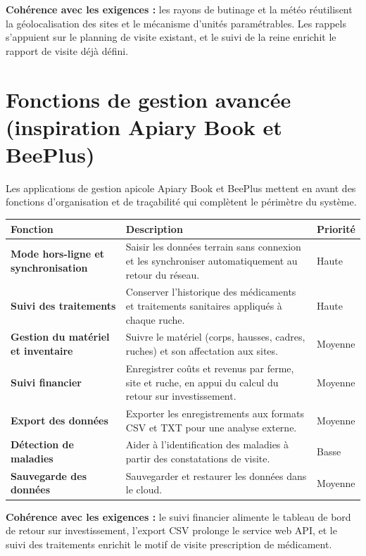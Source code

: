 \begin{encadre}
\textbf{Cohérence avec les exigences :} les rayons de butinage et la météo
réutilisent la géolocalisation des sites et le mécanisme d'unités paramétrables.
Les rappels s'appuient sur le planning de visite existant, et le suivi de la
reine enrichit le rapport de visite déjà défini.
\end{encadre}

\section{Fonctions de gestion avancée (inspiration Apiary Book et BeePlus)}
Les applications de gestion apicole Apiary Book et BeePlus mettent en avant des
fonctions d'organisation et de traçabilité qui complètent le périmètre du
système.
\begin{xltabular}{\textwidth}{>{\bfseries}p{4.2cm} X C{2.1cm}}
\toprule
\textbf{Fonction} & \textbf{Description} & \textbf{Priorité} \\
\midrule
\endhead
Mode hors-ligne et synchronisation & Saisir les données terrain sans connexion et les synchroniser automatiquement au retour du réseau. & Haute \\
Suivi des traitements & Conserver l'historique des médicaments et traitements sanitaires appliqués à chaque ruche. & Haute \\
Gestion du matériel et inventaire & Suivre le matériel (corps, hausses, cadres, ruches) et son affectation aux sites. & Moyenne \\
Suivi financier & Enregistrer coûts et revenus par ferme, site et ruche, en appui du calcul du retour sur investissement. & Moyenne \\
Export des données & Exporter les enregistrements aux formats CSV et TXT pour une analyse externe. & Moyenne \\
Détection de maladies & Aider à l'identification des maladies à partir des constatations de visite. & Basse \\
Sauvegarde des données & Sauvegarder et restaurer les données dans le cloud. & Moyenne \\
\bottomrule
\end{xltabular}
\begin{encadre}
\textbf{Cohérence avec les exigences :} le suivi financier alimente le tableau de
bord de retour sur investissement, l'export CSV prolonge le service web API, et
le suivi des traitements enrichit le motif de visite prescription de médicament.
\end{encadre}

